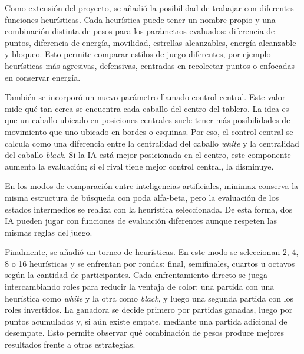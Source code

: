 \documentclass[12pt,letterpaper]{article}
\begin{document}
Como extensión del proyecto, se añadió la posibilidad de trabajar con diferentes funciones heurísticas. Cada heurística puede tener un nombre propio y una combinación distinta de pesos para los parámetros evaluados: diferencia de puntos, diferencia de energía, movilidad, estrellas alcanzables, energía alcanzable y bloqueo. Esto permite comparar estilos de juego diferentes, por ejemplo heurísticas más agresivas, defensivas, centradas en recolectar puntos o enfocadas en conservar energía.

También se incorporó un nuevo parámetro llamado control central. Este valor mide qué tan cerca se encuentra cada caballo del centro del tablero. La idea es que un caballo ubicado en posiciones centrales suele tener más posibilidades de movimiento que uno ubicado en bordes o esquinas. Por eso, el control central se calcula como una diferencia entre la centralidad del caballo \textit{white} y la centralidad del caballo \textit{black}. Si la IA está mejor posicionada en el centro, este componente aumenta la evaluación; si el rival tiene mejor control central, la disminuye.

En los modos de comparación entre inteligencias artificiales, minimax conserva la misma estructura de búsqueda con poda alfa-beta, pero la evaluación de los estados intermedios se realiza con la heurística seleccionada. De esta forma, dos IA pueden jugar con funciones de evaluación diferentes aunque respeten las mismas reglas del juego.

Finalmente, se añadió un torneo de heurísticas. En este modo se seleccionan 2, 4, 8 o 16 heurísticas y se enfrentan por rondas: final, semifinales, cuartos u octavos según la cantidad de participantes. Cada enfrentamiento directo se juega intercambiando roles para reducir la ventaja de color: una partida con una heurística como \textit{white} y la otra como \textit{black}, y luego una segunda partida con los roles invertidos. La ganadora se decide primero por partidas ganadas, luego por puntos acumulados y, si aún existe empate, mediante una partida adicional de desempate. Esto permite observar qué combinación de pesos produce mejores resultados frente a otras estrategias.
\end{document}
